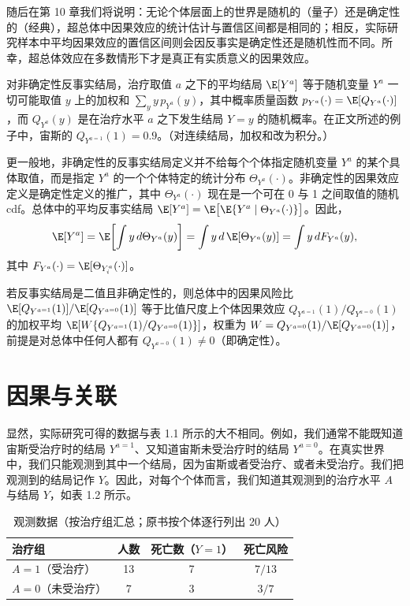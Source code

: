随后在第 10 章我们将说明：无论个体层面上的世界是随机的（量子）还是确定性的（经典），超总体中因果效应的统计估计与置信区间都是相同的；相反，实际研究样本中平均因果效应的置信区间则会因反事实是确定性还是随机性而不同。所幸，超总体效应在多数情形下才是真正有实质意义的因果效应。

\begin{techpoint}[非确定性反事实]
对非确定性反事实结局，治疗取值 $a$ 之下的平均结局 $\E[Y^{a}]$ 等于随机变量 $Y^{a}$ 一切可能取值 $y$ 上的加权和 $\sum_y y\,p_{Y^{a}}(y)$，其中概率质量函数 $p_{Y^{a}}(\cdot)=\E[Q_{Y^{a}}(\cdot)]$，而 $Q_{Y^{a}}(y)$ 是在治疗水平 $a$ 之下发生结局 $Y=y$ 的随机概率。在正文所述的例子中，宙斯的 $Q_{Y^{a=1}}(1)=0.9$。（对连续结局，加权和改为积分。）

更一般地，非确定性的反事实结局定义并不给每个个体指定随机变量 $Y^{a}$ 的某个具体取值，而是指定 $Y^{a}$ 的一个个体特定的统计分布 $\Theta_{Y^{a}}(\cdot)$。非确定性的因果效应定义是确定性定义的推广，其中 $\Theta_{Y^{a}}(\cdot)$ 现在是一个可在 0 与 1 之间取值的随机 cdf。总体中的平均反事实结局 $\E[Y^{a}]=\E\bigl[\E\{Y^{a}\mid\Theta_{Y^{a}}(\cdot)\}\bigr]$。因此，
\[
\E[Y^{a}]=\E\!\left[\int y\,d\Theta_{Y^{a}}(y)\right]=\int y\,d\,\E[\Theta_{Y^{a}}(y)]=\int y\,dF_{Y^{a}}(y),
\]
其中 $F_{Y^{a}}(\cdot)=\E[\Theta_{Y^{a}_i}(\cdot)]$。

若反事实结局是二值且非确定性的，则总体中的因果风险比 $\E[Q_{Y^{a=1}}(1)]/\E[Q_{Y^{a=0}}(1)]$ 等于比值尺度上个体因果效应 $Q_{Y^{a=1}}(1)/Q_{Y^{a=0}}(1)$ 的加权平均 $\E[W\{Q_{Y^{a=1}}(1)/Q_{Y^{a=0}}(1)\}]$，权重为 $W=Q_{Y^{a=0}}(1)/\E[Q_{Y^{a=0}}(1)]$，前提是对总体中任何人都有 $Q_{Y^{a=0}}(1)\neq 0$（即确定性）。
\end{techpoint}

\section{因果与关联}


显然，实际研究可得的数据与表 1.1 所示的大不相同。例如，我们通常不能既知道宙斯受治疗时的结局 $Y^{a=1}$、又知道宙斯未受治疗时的结局 $Y^{a=0}$。在真实世界中，我们只能观测到其中一个结局，因为宙斯或者受治疗、或者未受治疗。我们把观测到的结局记作 $Y$。因此，对每个个体而言，我们知道其观测到的治疗水平 $A$ 与结局 $Y$，如表 1.2 所示。

\begin{table}[htbp]
\centering
\caption{观测数据（按治疗组汇总；原书按个体逐行列出 20 人）}
\label{tab:1.2}
\small
\begin{tabular}{lccc}
\toprule
治疗组 & 人数 & 死亡数（$Y=1$） & 死亡风险 \\
\midrule
$A=1$（受治疗） & 13 & 7 & $7/13$ \\
$A=0$（未受治疗） & 7 & 3 & $3/7$ \\
\bottomrule
\end{tabular}
\end{table}

